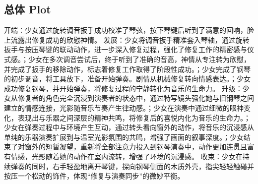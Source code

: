 \documentclass[11pt,a4paper]{article}
\begin{document}
\subsection*{总体 Plot}
开端：少女通过旋转调音扳手成功校准了琴弦，按下琴键后听到了满意的回响，脸上流露出修复成功的欣慰神情。 发展：少女将调音扳手精准套入琴轴，通过旋转扳手与按压琴键的联动动作，进一步深入修复过程，强化了修复工作的精密感与仪式感。；少女在多次调音尝试后，终于听到了准确的音高，神情从专注转为欣慰，并完成了扳手的移除动作，标志着修复工作取得了阶段性成功。；少女完成了钢琴的初步调音，将工具放下，准备开始弹奏。剧情从机械修复转向情感表达。；少女成功修复钢琴，并开始弹奏，将修复过程的宁静转化为音乐的生命力。 升级：少女从修复者的角色完全沉浸到演奏者的状态中，通过特写镜头强化她与旧钢琴之间建立的情感连接，光影随音乐节奏产生律动感。；少女在演奏中通过细微的眼神变化，表现出与乐器之间深层的精神共鸣，将修复后的喜悦内化为音乐的生命力。；少女在弹奏过程中与环境产生互动，通过转头看向窗外的动作，将音乐的沉浸感从单纯的乐器演奏扩展到与温室光影氛围的共鸣，增强了画面的叙事深度。；少女结束了对窗外的短暂凝望，重新将全部注意力投入到钢琴演奏中，动作更加连贯且富有情感，光影随着她的动作在室内流转，增强了环境的沉浸感。 收束：少女在持续弹奏的同时，右手轻盈地离开琴键，探向钢琴侧面的木质外壳，指尖轻轻触碰并按压一个松动的饰件，体现“修复与演奏同步”的微妙平衡。
\end{document}

